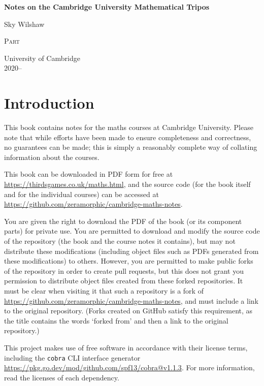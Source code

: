 \documentclass{book}
\begin{document}
\begin{titlepage}
	\begin{center}
		\vspace*{1cm}

		\Huge
		\textbf{Notes on the Cambridge University Mathematical Tripos}

		\vspace{0.5cm}
		\LARGE
		Sky Wilshaw

		\vfill

		\Huge
		\textsc{Part \yearnumber}

		\vfill

		\Large
		University of Cambridge\\
		2020--\the\year{}

	\end{center}
\end{titlepage}

\dominitoc{}

\setcounter{tocdepth}{0}
\tableofcontents
\newpage
\setcounter{tocdepth}{3}

\chapter*{Introduction}
This book contains notes for the maths courses at Cambridge University.
Please note that while efforts have been made to ensure completeness and correctness, no guarantees can be made; this is simply a reasonably complete way of collating information about the courses.

This book can be downloaded in PDF form for free at \url{https://thirdsgames.co.uk/maths.html}, and the source code (for the book itself and for the individual courses) can be accessed at \url{https://github.com/zeramorphic/cambridge-maths-notes}.

You are given the right to download the PDF of the book (or its component parts) for private use.
You are permitted to download and modify the source code of the repository (the book and the course notes it contains), but may not distribute these modifications (including object files such as PDFs generated from these modifications) to others.
However, you are permitted to make public forks of the repository in order to create pull requests, but this does not grant you permission to distribute object files created from these forked repositories.
It must be clear when visiting it that such a repository is a fork of \url{https://github.com/zeramorphic/cambridge-maths-notes}, and must include a link to the original repository.
(Forks created on GitHub satisfy this requirement, as the title contains the words `forked from' and then a link to the original repository.)

This project makes use of free software in accordance with their license terms, including the \texttt{cobra} CLI interface generator \\ \url{https://pkg.go.dev/mod/github.com/spf13/cobra@v1.1.3}.
For more information, read the licenses of each dependency.

\let\maketitle\ignorespaces{}
\renewcommand{\tableofcontentsnewpage}{\minitoc\newpage}
\end{document}
